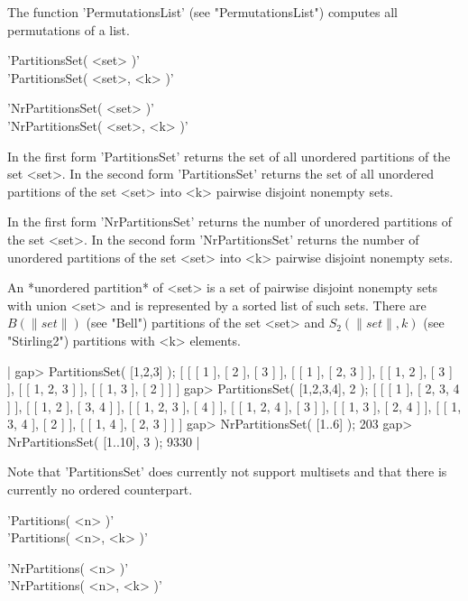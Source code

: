 The function  'PermutationsList'  (see  "PermutationsList")  computes all
permutations of a list.

%

'PartitionsSet( <set> )' \\
'PartitionsSet( <set>, <k> )'

'NrPartitionsSet( <set> )' \\
'NrPartitionsSet( <set>, <k> )'

In  the first  form  'PartitionsSet'  returns the  set  of  all unordered
partitions of the set <set>.   In the second form 'PartitionsSet' returns
the set of  all unordered partitions of the  set <set> into  <k> pairwise
disjoint nonempty sets.

In  the first  form  'NrPartitionsSet' returns   the number of  unordered
partitions of   the  set <set>.   In  the  second  form 'NrPartitionsSet'
returns  the number of  unordered  partitions of  the  set <set> into <k>
pairwise disjoint nonempty sets.

An *unordered partition* of <set> is  a set of pairwise disjoint nonempty
sets with union <set>  and is represented by  a sorted list of such sets.
There are $B( \|set\| )$ (see "Bell") partitions of  the  set  <set>  and
$S_2( \|set\|, k )$ (see "Stirling2") partitions with <k> elements.

|    gap> PartitionsSet( [1,2,3] );
    [ [ [ 1 ], [ 2 ], [ 3 ] ], [ [ 1 ], [ 2, 3 ] ], [ [ 1, 2 ], [ 3 ] ],
      [ [ 1, 2, 3 ] ], [ [ 1, 3 ], [ 2 ] ] ]
    gap> PartitionsSet( [1,2,3,4], 2 );
    [ [ [ 1 ], [ 2, 3, 4 ] ], [ [ 1, 2 ], [ 3, 4 ] ],
      [ [ 1, 2, 3 ], [ 4 ] ], [ [ 1, 2, 4 ], [ 3 ] ],
      [ [ 1, 3 ], [ 2, 4 ] ], [ [ 1, 3, 4 ], [ 2 ] ],
      [ [ 1, 4 ], [ 2, 3 ] ] ]
    gap> NrPartitionsSet( [1..6] );
    203
    gap> NrPartitionsSet( [1..10], 3 );
    9330 |

Note  that 'PartitionsSet' does currently  not support multisets and that
there is currently no ordered counterpart.

%

'Partitions( <n> )' \\
'Partitions( <n>, <k> )'

'NrPartitions( <n> )' \\
'NrPartitions( <n>, <k> )'

